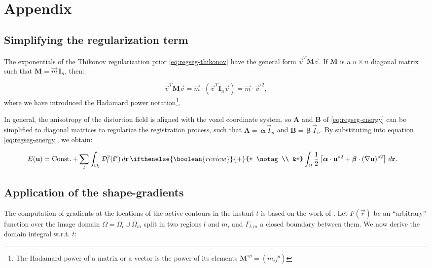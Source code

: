 
\renewcommand{\theequation}{A.\arabic{equation}}
\renewcommand{\thesubsection}{Appendix \arabic{subsection}}

\section*{Appendix}

\subsection{Simplifying the regularization term}\label{app:reg_term}
The exponentials of the Thikonov regularization prior \eqref{eq:regseg-thikonov} have the general form
  $\vec{v}^T \mathbf{M} \vec{v}$.
If $\mathbf{M}$ is a $n \times n$ diagonal matrix such that $\mathbf{M} = \vec{m} \, \mathbf{I}_n$,
  then:

\begin{equation*}
\vec{v}^T \mathbf{M} \vec{v} = \vec{m} \cdot (\vec{v}^T \mathbf{I}_n \vec{v}) = \vec{m} \cdot \vec{v}^{\circ2},
\end{equation*}
  where we have introduced the Hadamard power notation\footnote{The Hadamard power of a matrix or a vector
  is the power of its elements $\mathbf{M}^{\circ p} = ({m_{ij}}^{p})$}.

In general, the anisotropy of the distortion field is aligned with the 
  voxel coordinate system, so
  $\mathbf{A}$ and $\mathbf{B}$ of \eqref{eq:regseg-energy} can be simplified to diagonal matrices
  to regularize the registration process, such that
  $\mathbf{A}= \, \boldsymbol{\alpha}\,\vec{I}_n$ and
  $\mathbf{B}= \, \boldsymbol{\beta}\,\vec{I}_n$.
By substituting into equation \eqref{eq:regseg-energy}, we obtain:

  \begin{align}
  E(\vec{u}) &= \const + \, \underset{l}{\sum} \int_{\Omega_l} \mdist{f'}{l} \,d\vec{r} \,
  \ifthenelse{\boolean{review}}{+}{+ \notag\\ &+}
  \int_{\Omega} \frac12 \left[ \boldsymbol{\alpha} \cdot \vec{u}^{\circ2} + \boldsymbol{\beta} \cdot (\nabla \vec{u})^{\circ2} \right] \,d\vec{r}.
  \label{eq:regseg-app_energy}
  \end{align}

\subsection{Application of the shape-gradients}\label{app:shape_gradients}
The computation of gradients at the locations of the active contours in the
  instant $t$ is based on the work of \cite{herbulot_segmentation_2006}.
Let $F(\vec{r})$ be an ``arbitrary'' function over the image domain
  $\Omega = \Omega_l \cup \Omega_m$ split in two regions $l$ and
  $m$, and $\Gamma_{l,m}$ a closed boundary between them.
We now derive the domain integral w.r.t. $t$:

